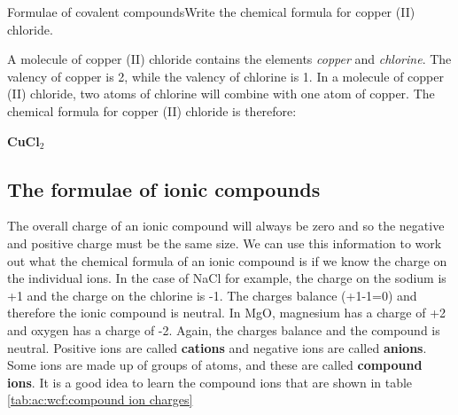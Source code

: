 \begin{wex}{Formulae of covalent compounds}{Write the chemical formula for copper (II) chloride.\\}

{
A molecule of copper (II) chloride contains the elements \textit{copper} and \textit{chlorine}.
The valency of copper is 2, while
the valency of chlorine is 1. In a molecule of copper (II) chloride, two atoms of chlorine will combine with one atom of copper.
The chemical formula for copper (II) chloride is therefore:

\begin{center}
\textbf{CuCl$_{2}$}
\end{center}}
\end{wex}

\subsection{The formulae of ionic compounds}

The overall charge of an ionic compound will always be zero and so the negative and positive charge must be the same size. We can use this information to work out what the chemical formula of an ionic compound is if we know the charge on the individual ions. In the case of NaCl for example, the charge on the sodium is +1 and the charge on the chlorine is -1. The charges balance (+1-1=0) and therefore the ionic compound is neutral. In MgO, magnesium has a charge of +2 and oxygen has a charge of -2. Again, the charges balance and the compound is neutral. Positive ions are called \textbf{cations} and negative ions are called \textbf{anions}.\\

Some ions are made up of groups of atoms, and these are called \textbf{compound ions}. It is a good idea to learn the compound ions that are shown in table \ref{tab:ac:wcf:compound ion charges}

